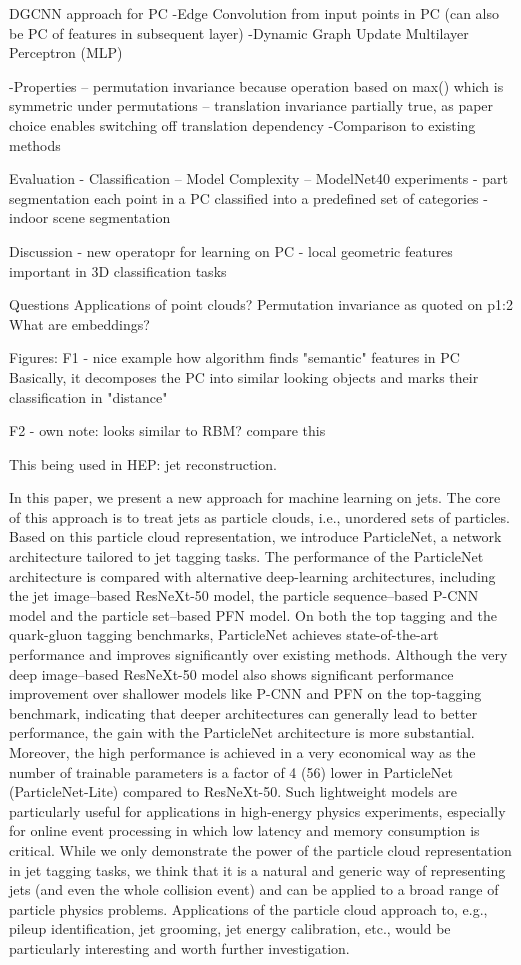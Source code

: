 DGCNN approach for PC
-Edge Convolution
from input points in PC (can also be PC of features in subsequent layer)
-Dynamic Graph Update
Multilayer Perceptron (MLP)

-Properties
-- permutation invariance
because operation based on max() which is symmetric under permutations
-- translation invariance
partially true, as paper choice enables switching off translation dependency
-Comparison to existing methods

Evaluation
- Classification
-- Model Complexity
-- ModelNet40 experiments
- part segmentation
each point in a PC classified into a predefined set of categories
- indoor scene segmentation

Discussion
- new operatopr for learning on PC
- local geometric features important in 3D classification tasks



Questions
Applications of point clouds?
Permutation invariance as quoted on p1:2
What are embeddings?

Figures:
F1 - nice example how algorithm finds "semantic" features in PC
Basically, it decomposes the PC into similar looking objects and marks their
classification in "distance"

F2 - own note: looks similar to RBM? compare this

This being used in HEP: jet reconstruction.

In this paper, we present a new approach for machine
learning on jets. The core of this approach is to treat
jets as particle clouds, i.e., unordered sets of particles.
Based on this particle cloud representation, we introduce
ParticleNet, a network architecture tailored to jet tagging tasks. The performance of the ParticleNet architecture is compared with alternative deep-learning architectures, including the jet image–based ResNeXt-50
model, the particle sequence–based P-CNN model and
the particle set–based PFN model. On both the top
tagging and the quark-gluon tagging benchmarks, ParticleNet achieves state-of-the-art performance and improves significantly over existing methods. Although the
very deep image–based ResNeXt-50 model also shows significant performance improvement over shallower models
like P-CNN and PFN on the top-tagging benchmark, indicating that deeper architectures can generally lead to
better performance, the gain with the ParticleNet architecture is more substantial. Moreover, the high performance is achieved in a very economical way as the number of trainable parameters is a factor of 4 (56) lower in
ParticleNet (ParticleNet-Lite) compared to ResNeXt-50.
Such lightweight models are particularly useful for applications in high-energy physics experiments, especially for
online event processing in which low latency and memory
consumption is critical.
While we only demonstrate the power of the particle
cloud representation in jet tagging tasks, we think that
it is a natural and generic way of representing jets (and
even the whole collision event) and can be applied to a
broad range of particle physics problems. Applications
of the particle cloud approach to, e.g., pileup identification, jet grooming, jet energy calibration, etc., would be
particularly interesting and worth further investigation.


